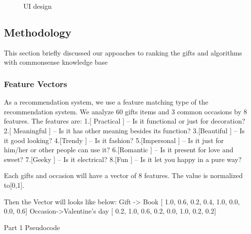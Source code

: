 \documentclass[11pt,twocolumn]{article}
\begin{document}
\begin{figure}[h!t]
\caption{UI design}
\label{ui}
\end{figure}

\subsection{Methodology}

This section briefly discussed our appoaches to ranking the gifts and algorithms with commonsense knowledge base

\subsubsection{Feature Vectors}
As a recommendation system, we use a feature matching type of the recommendation system.
We analyze 60 gifts items and 3 common occasions by 8 features.  
The features are:
1.[ Practical   ] – Is it functional or just for decoration?
2.[ Meaningful  ] – Is it has other meaning besides its function? 
3.[Beautiful    ] – Is it good looking?
4.[Trendy       ] – Is it fashion?
5.[Impersonal   ] – Is it just for him/her or other people can use it?
6.[Romantic ] – Is it present for love and sweet?
7.[Geeky        ] – Is it electrical?
8.[Fun      ] – Is it let you happy in a pure way?

Each gifts and occasion will have a vector of 8 features.  The value is normalized to[0,1].

Then the Vector will looks like below:
Gift     -> Book              [ 1.0, 0.6, 0.2, 0.4, 1.0, 0.0, 0.0, 0.6]
Occasion->Valentine’s day     [ 0.2, 1.0, 0.6, 0.2, 0.0, 1.0, 0.2, 0.2]


Part 1
Pseudocode
\end{document}
